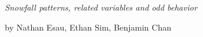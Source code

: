 \begin{titlepage}
\newcommand{\HRule}{\rule{\linewidth}{0.5mm}} 

\center %


\mbox{ }
\vspace{75mm}

{ \Huge \bfseries \color{black}{Analysis of whistler weather data}}\\[0.4cm] 

{\Large
\textsl{Snowfall patterns, related variables and odd behavior}}

\bigskip
{\Large
by Nathan Esau, Ethan Sim, Benjamin Chan}

\vfill



\end{titlepage}